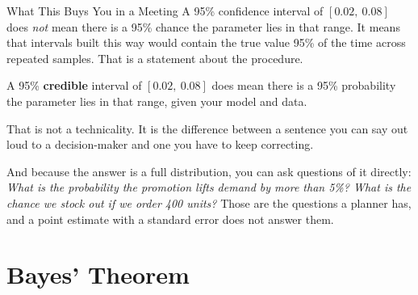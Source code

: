 \documentclass[aspectratio=169, 11pt]{beamer}
\begin{document}
\begin{frame}{What This Buys You in a Meeting}
  A 95\% confidence interval of $[0.02,\ 0.08]$ does \emph{not} mean there is a 95\% chance the
  parameter lies in that range. It means that intervals built this way would contain the true
  value 95\% of the time across repeated samples. That is a statement about the procedure.

  \vspace{0.15cm}
  A 95\% \textbf{credible} interval of $[0.02,\ 0.08]$ does mean there is a 95\% probability the
  parameter lies in that range, given your model and data.

  \begin{keybox}
    That is not a technicality. It is the difference between a sentence you can say out loud to a
    decision-maker and one you have to keep correcting.
  \end{keybox}

  \vspace{0.1cm}
  And because the answer is a full distribution, you can ask questions of it directly:
  \emph{What is the probability the promotion lifts demand by more than 5\%? What is the chance
  we stock out if we order 400 units?} Those are the questions a planner has, and a point
  estimate with a standard error does not answer them.

  \vspace{0.1cm}
\end{frame}

\section{Bayes' Theorem}

\end{document}
